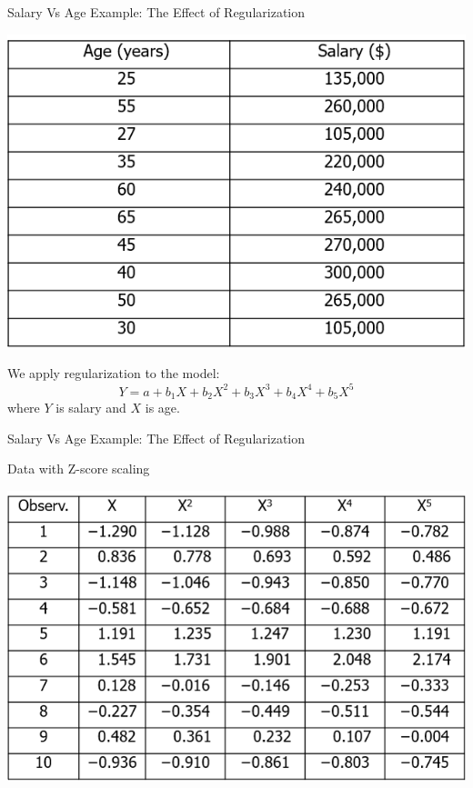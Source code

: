 \documentclass[11pt]{beamer}
\begin{document}
\begin{frame}{Salary Vs Age Example: The Effect of Regularization}
	\begin{center}
	\includegraphics[scale=.4]{../05-pictures/lesson-2-1_pic_17.png}
	\end{center}
We apply regularization to the model:
\begin{equation}
Y = a + b_1X + b_2X^2 + b_3X^3 + b_4X^4 + b_5 X^5
\end{equation}
where $Y$ is salary and $X$ is age.
\end{frame}
\begin{frame}{Salary Vs Age Example: The Effect of Regularization}

Data with Z-score scaling
	\begin{center}
	\includegraphics[scale=.6]{../05-pictures/lesson-2-1_pic_18.png}
	\end{center}
\end{frame}
\end{document}

